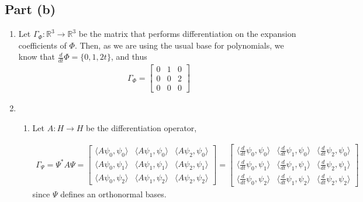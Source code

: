 \documentclass{article}
\begin{document}
\subsection*{Part (b)}
\begin{enumerate}[label=(\roman*), resume]
    \item Let $\Gamma_\Phi: \mathbb{R}^3 \to \mathbb{R}^3$ be the matrix that performs differentiation on the expansion coefficients of $\Phi$. Then, as we are using the usual base for polynomials, we know that $\frac{d}{dt}\Phi = \{0,1,2t\}$, and thus
    \begin{align}
        \Gamma_\Phi = \begin{bmatrix}
            0 & 1 & 0 \\
            0 & 0 & 2 \\
            0 & 0 & 0
        \end{bmatrix}
    \end{align}
    \item \begin{enumerate}[label=(\alph*)]
        \item Let $A:H \to H$ be the differentiation operator,

    \begin{align}
        \Gamma_\Psi = \Psi^* A \Psi =
        \begin{bmatrix}
            \langle A\psi_0, \psi_0 \rangle & \langle A\psi_1, \psi_0 \rangle & \langle A\psi_2, \psi_0 \rangle \\
            \langle A\psi_0, \psi_1 \rangle & \langle A \psi_1, \psi_1 \rangle & \langle A\psi_2, \psi_1 \rangle \\
            \langle A \psi_0, \psi_2 \rangle & \langle A \psi_1, \psi_2 \rangle & \langle A \psi_2, \psi_2 \rangle
        \end{bmatrix}
    =
    \begin{bmatrix}
            \langle \frac{d}{dt}\psi_0, \psi_0 \rangle & \langle \frac{d}{dt}\psi_1, \psi_0 \rangle & \langle \frac{d}{dt}\psi_2, \psi_0 \rangle \\
            \langle \frac{d}{dt}\psi_0, \psi_1 \rangle & \langle \frac{d}{dt} \psi_1, \psi_1 \rangle & \langle \frac{d}{dt}\psi_2, \psi_1 \rangle \\
            \langle \frac{d}{dt} \psi_0, \psi_2 \rangle & \langle \frac{d}{dt} \psi_1, \psi_2 \rangle & \langle \frac{d}{dt} \psi_2, \psi_2 \rangle
        \end{bmatrix}
    \end{align}
    since $\Psi$ defines an orthonormal bases.
    

\end{enumerate}
\end{enumerate}
\end{document}
